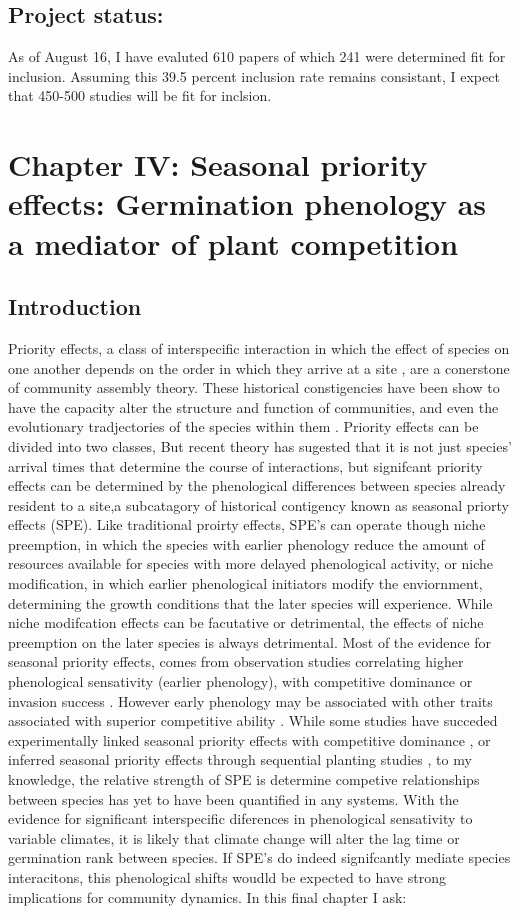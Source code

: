 \documentclass{article}\usepackage[]{graphicx}\usepackage[]{color}
\begin{document}
{{\subsection*{Project status:}
As of August 16, I have evaluted 610 papers of which 241 were determined fit for inclusion. Assuming this 39.5 percent inclusion rate remains consistant, I expect that 450-500 studies will be fit for inclsion.
\section*{Chapter IV: Seasonal priority effects: Germination phenology as a mediator of plant competition}
\subsection*{Introduction}
\indent Priority effects, a class of interspecific interaction in which the effect of species on one another depends on the order in which they arrive at a site \citep{Fukami20015}, are a conerstone of community assembly theory. These historical constigencies have been show to have the capacity alter the structure and function of communities, and even the evolutionary tradjectories of the species within them \citep{}. Priority effects can be divided into two classes,  But recent theory has sugested that it is not just species' arrival times that determine the course of interactions, but signifcant priority effects can be determined by the phenological differences between species already resident to a site,a subcatagory of historical contigency known as seasonal priorty effects (SPE). Like traditional proirty effects, SPE's can operate though niche preemption, in which the species with earlier phenology reduce the amount of resources available for species with more delayed phenological activity, or niche modification, in which earlier phenological initiators modify the enviornment, determining the growth conditions that the later species will experience. While niche modifcation effects can be facutative or detrimental, the effects of niche preemption on the later species is always detrimental. Most of the evidence for seasonal priority effects, comes from observation studies correlating higher phenological sensativity (earlier phenology), with competitive dominance or invasion success \citep{}. However early phenology may be associated with other traits associated with superior competitive ability \citep{}.  While some studies have succeded experimentally linked seasonal priority effects with competitive dominance \citep{Wainwright}, or inferred seasonal priority effects through sequential planting studies \citep{Korner2008}, to my knowledge, the relative strength of SPE is determine competive relationships between species has yet to have been quantified in any systems. With the evidence for significant interspecific diferences in phenological sensativity to variable climates, it is likely that climate change will alter the lag time or germination rank between species. If SPE's do indeed signifcantly mediate species interacitons, this phenological shifts woudld be expected to have strong implications for community dynamics. In this final chapter I ask:
}}
\end{document}

